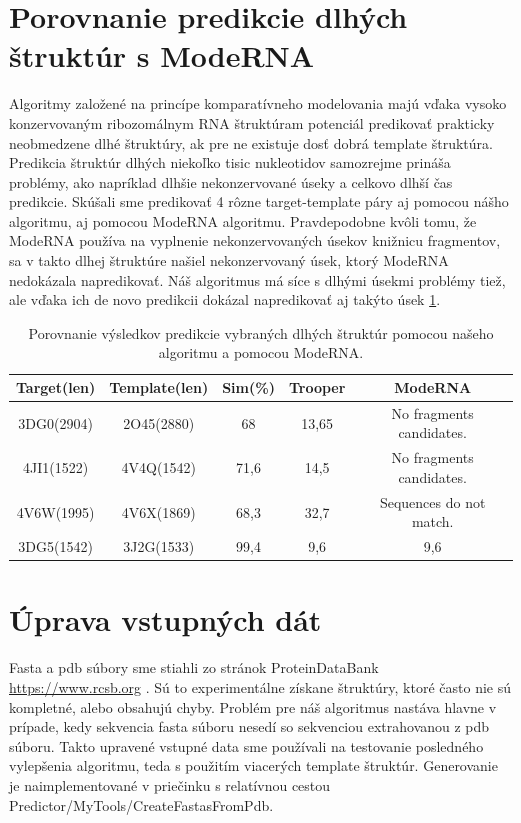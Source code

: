 \section{Porovnanie predikcie dlhých štruktúr s ModeRNA}
Algoritmy založené na princípe komparatívneho modelovania majú vďaka vysoko konzervovaným ribozomálnym RNA štruktúram potenciál predikovať prakticky neobmedzene dlhé štruktúry, ak pre ne existuje dosť dobrá template štruktúra. Predikcia štruktúr dlhých niekoľko tisic nukleotidov samozrejme prináša problémy, ako napríklad dlhšie nekonzervované úseky a celkovo dlhší čas predikcie. Skúšali sme predikovať 4 rôzne target-template páry aj pomocou nášho algoritmu, aj pomocou ModeRNA algoritmu. Pravdepodobne kvôli tomu, že ModeRNA používa na vyplnenie nekonzervovaných úsekov knižnicu fragmentov, sa v takto dlhej štruktúre našiel nekonzervovaný úsek, ktorý ModeRNA nedokázala napredikovať. Náš algoritmus má síce s dlhými úsekmi problémy tiež, ale vďaka ich de novo predikcii dokázal napredikovať aj takýto úsek \ref{tab4.3}.

\begin{table}[b!]
\centering
\begin{tabular}{ccccc}
\toprule
Target(len) & Template(len) & Sim(\%) & Trooper & ModeRNA\\
\midrule
3DG0(2904)  & 2O45(2880) & 68  & 13,65 & No fragments candidates.\\
4JI1(1522)  & 4V4Q(1542) & 71,6  & 14,5 &  No fragments candidates.\\
4V6W(1995)  &  4V6X(1869) & 68,3  & 32,7 & Sequences do not match.\\
3DG5(1542)  & 3J2G(1533) &  99,4  & 9,6 & 9,6\\
\bottomrule
\end{tabular}
\caption{Porovnanie výsledkov predikcie vybraných dlhých štruktúr pomocou našeho algoritmu a pomocou ModeRNA. }\label{tab4.3}
\end{table}


\section{Úprava vstupných dát}
Fasta a pdb súbory sme stiahli zo stránok ProteinDataBank \url{https://www.rcsb.org} \cite{PDB00}. Sú to experimentálne získane štruktúry, ktoré často nie sú kompletné, alebo obsahujú chyby. Problém pre náš algoritmus nastáva hlavne v prípade, kedy sekvencia fasta súboru nesedí so sekvenciou extrahovanou z pdb súboru. Takto upravené vstupné data sme používali na testovanie posledného vylepšenia algoritmu, teda s použitím viacerých template štruktúr. Generovanie je naimplementované v priečinku s relatívnou cestou Predictor/MyTools/CreateFastasFromPdb.


